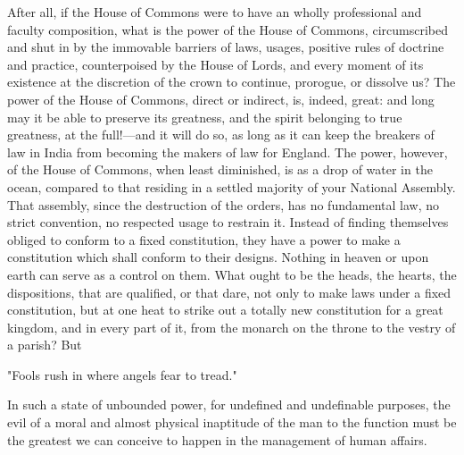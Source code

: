 After all, if the House of Commons were to have an wholly professional and faculty composition, what is the power of the House of Commons, circumscribed and shut in by the immovable barriers of laws, usages, positive rules of doctrine and practice, counterpoised by the House of Lords, and every moment of its existence at the discretion of the crown to continue, prorogue, or dissolve us? The power of the House of Commons, direct or indirect, is, indeed, great: and long may it be able to preserve its greatness, and the spirit belonging to true greatness, at the full!—and it will do so, as long as it can keep the breakers of law in India from becoming the makers of law for England. The power, however, of the House of Commons, when least diminished, is as a drop of water in the ocean, compared to that residing in a settled majority of your National Assembly. That assembly, since the destruction of the orders, has no fundamental law, no strict convention, no respected usage to restrain it. Instead of finding themselves obliged to conform to a fixed constitution, they have a power to make a constitution which shall conform to their designs. Nothing in heaven or upon earth can serve as a control on them. What ought to be the heads, the hearts, the dispositions, that are qualified, or that dare, not only to make laws under a fixed constitution, but at one heat to strike out a totally new constitution for a great kingdom, and in every part of it, from the monarch on the throne to the vestry of a parish? But

\centerline{"Fools rush in where angels fear to tread."}

In such a state of unbounded power, for undefined and undefinable purposes, the evil of a moral and almost physical inaptitude of the man to the function must be the greatest we can conceive to happen in the management of human affairs.

